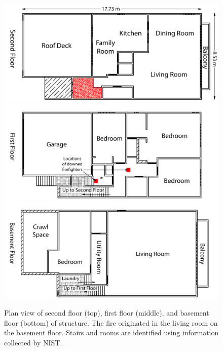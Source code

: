 \documentclass[12pt,oneside]{book}
\begin{document}
\begin{figure}[!ht]
\includegraphics[width=5.0in]{../Figures/Plan_Second_Floor}
\includegraphics[width=5.0in]{../Figures/Plan_First_Floor}
\includegraphics[width=5.0in]{../Figures/Plan_Basement_Floor}
\caption[Plan view of second floor, first floor, and basement floor of structure.]
{Plan view of second floor (top), first floor (middle), and basement floor (bottom) of structure. The fire originated in the living room on the basement floor. Stairs and rooms are identified using information collected by NIST.}
\label{fig:floor_plan}
\end{figure}
\end{document}
